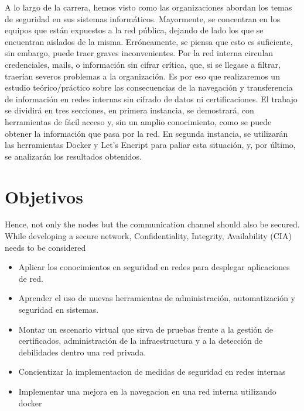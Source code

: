 %


A lo largo de la carrera, hemos visto como las organizaciones abordan los temas de seguridad en sus sistemas informáticos. Mayormente, se concentran en los equipos que están expuestos a la red pública, dejando de lado los que se encuentran aislados de la misma. Erróneamente, se piensa que esto es suficiente, sin embargo, puede traer graves inconvenientes. Por la red interna circulan credenciales, mails, o información sin cifrar crítica, que, si se llegase a filtrar, traerían severos problemas a la organización.  Es por eso que realizaremos un estudio teórico/práctico sobre las consecuencias de la navegación y transferencia de información en redes internas sin cifrado de datos ni certificaciones. 
El trabajo se dividirá en tres secciones, en primera instancia, se demostrará, con herramientas de fácil acceso y, sin un amplio conocimiento, como se puede obtener la información que pasa por la red. En segunda instancia, se utilizarán las herramientas Docker y Let’s Encript para paliar esta situación, y, por último, se analizarán los resultados obtenidos.
\section{Objetivos}

Hence, not only the nodes but the communication channel should also be secured.
While developing a secure network, Confidentiality, Integrity, Availability (CIA)
needs to be considered


\begin{itemize}
    \item Aplicar los conocimientos en seguridad en redes para desplegar aplicaciones de red.
    \item Aprender el uso de nuevas herramientas de administración, automatización y seguridad en sistemas.
    \item Montar un escenario virtual que sirva de pruebas frente a la gestión de certificados, administración de la infraestructura y a la detección de debilidades dentro una red privada.
    \item Concientizar la implementacion de medidas de seguridad en redes internas
    \item Implementar una mejora en la navegacion en una red interna utilizando docker
\end{itemize}


